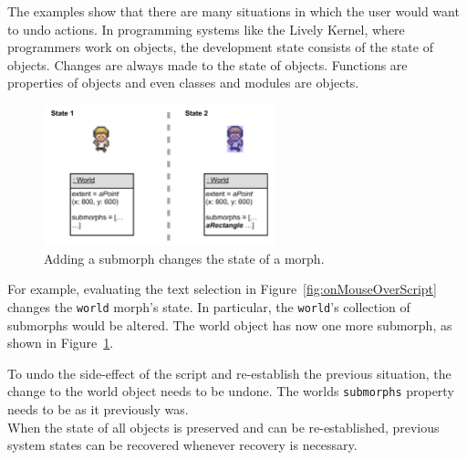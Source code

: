 The examples show that there are many situations in which the user would want to undo actions.
In programming systems like the Lively Kernel, where programmers work on objects, the development state consists of the state of objects.
Changes are always made to the state of objects.
Functions are properties of objects and even classes and modules are objects.

\begin{figure}[h]
    \centering
    \includegraphics[width=0.6\textwidth]{figures/3_motivation/5_stateChanges.pdf}
    \caption{Adding a submorph changes the state of a morph.}
    \label{fig:changedCharacter}
\end{figure}

For example, evaluating the text selection in Figure~\ref{fig:onMouseOverScript} changes the \lstinline{world} morph's state.
In particular, the \lstinline{world}'s collection of submorphs would be altered.
The world object has now one more submorph, as shown in Figure~\ref{fig:changedCharacter}.

To undo the side-effect of the script and re-establish the previous situation, the change to the world object needs to be undone.
The worlds \lstinline{submorphs} property needs to be as it previously was.\\
When the state of all objects is preserved and can be re-established, previous system states can be recovered whenever recovery is necessary.
